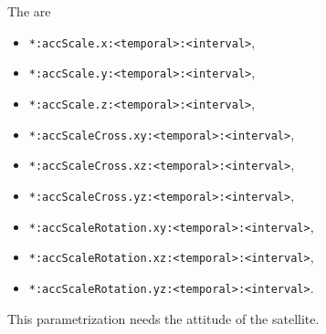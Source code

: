The  are
\begin{itemize}
\item \verb|*:accScale.x:<temporal>:<interval>|,
\item \verb|*:accScale.y:<temporal>:<interval>|,
\item \verb|*:accScale.z:<temporal>:<interval>|,
\item \verb|*:accScaleCross.xy:<temporal>:<interval>|,
\item \verb|*:accScaleCross.xz:<temporal>:<interval>|,
\item \verb|*:accScaleCross.yz:<temporal>:<interval>|,
\item \verb|*:accScaleRotation.xy:<temporal>:<interval>|,
\item \verb|*:accScaleRotation.xz:<temporal>:<interval>|,
\item \verb|*:accScaleRotation.yz:<temporal>:<interval>|.
\end{itemize}

This parametrization needs the attitude of the satellite.


